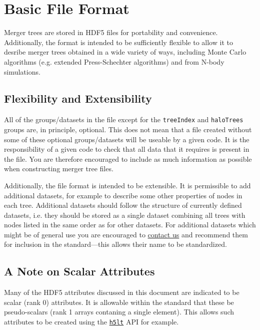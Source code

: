 \section{Basic File Format}\label{sec:MergerTreeFormatDescription}

Merger trees are stored in HDF5 files for portability and convenience. Additionally, the format is intended to be sufficiently flexible to allow it to desribe merger trees obtained in a wide variety of ways, including Monte Carlo algorithms (e.g. extended Press-Schechter algorithms) and from N-body simulations. 

\subsection{Flexibility and Extensibility}

All of the groups/datasets in the file except for the {\tt treeIndex} and {\tt haloTrees} groups are, in principle, optional. This does not mean that a file created without some of these optional groups/datasets will be useable by a given code. It is the responsibility of a given code to check that all data that it requires is present in the file. You are therefore encouraged to include as much information as possible when constructing merger tree files.

Additionally, the file format is intended to be extensible. It is permissible to add additional datasets, for example to describe some other properties of nodes in each tree. Additional datasets should follow the structure of currently defined datasets, i.e. they should be stored as a single dataset combining all trees with nodes listed in the same order as for other datasets. For additional datasets which might be of general use you are encouraged to \href{mailto:abenson@caltech.edu}{contact us} and recommend them for inclusion in the standard---this allows their name to be standardized.

\subsection{A Note on Scalar Attributes}

Many of the HDF5 attributes discussed in this document are indicated to be scalar (rank 0) attributes. It is allowable within the standard that these be pseudo-scalars (rank 1 arrays contaning a single element). This allows such attributes to be created using the \href{http://www.hdfgroup.org/HDF5/doc/HL/RM_H5LT.html}{\tt h5lt} API for example.

